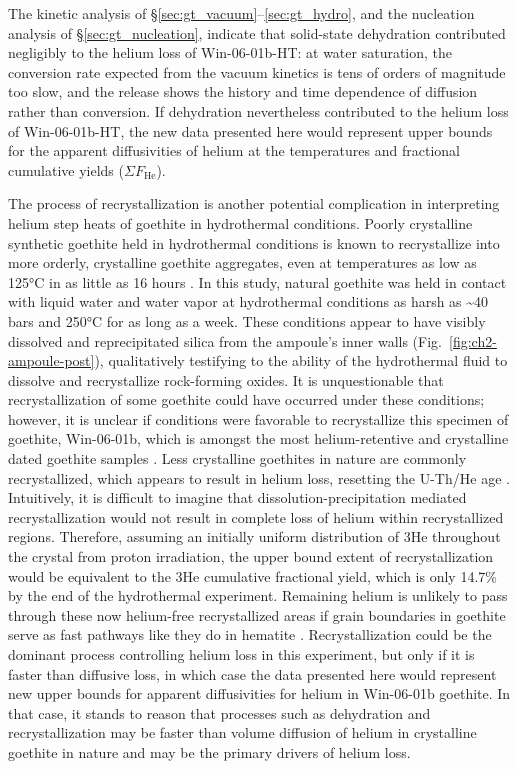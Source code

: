 The kinetic analysis of \S\ref{sec:gt_vacuum}--\ref{sec:gt_hydro}, and the nucleation analysis of
\S\ref{sec:gt_nucleation}, indicate that solid-state dehydration contributed negligibly to the helium loss of Win-06-01b-HT: at water
saturation, the conversion rate expected from the vacuum kinetics is tens of orders of magnitude
too slow, and the release shows the history and time dependence of diffusion rather than
conversion. If dehydration nevertheless contributed to the helium loss of Win-06-01b-HT, the new
data presented here would represent upper
bounds for the apparent diffusivities of helium at the temperatures and
fractional cumulative yields ($\Sigma F_{\mathrm{He}}$).

The process of recrystallization is another potential complication in
interpreting helium step heats of goethite in hydrothermal conditions.
Poorly crystalline synthetic goethite held in hydrothermal conditions is
known to recrystallize into more orderly, crystalline goethite
aggregates, even at temperatures as low as 125°C in as little as 16
hours \citep{schwertmann1985}. In this study, natural goethite was
held in contact with liquid water and water vapor at hydrothermal
conditions as harsh as \textasciitilde40 bars and 250°C for as long as a
week. These conditions appear to have visibly dissolved and
reprecipitated silica from the ampoule's inner walls (Fig.~\ref{fig:ch2-ampoule-post}),
qualitatively testifying to the ability of the hydrothermal fluid to
dissolve and recrystallize rock-forming oxides. It is unquestionable
that recrystallization of some goethite could have occurred under these
conditions; however, it is unclear if conditions were favorable to
recrystallize this specimen of goethite, Win-06-01b, which is amongst
the most helium-retentive and crystalline dated goethite samples
\citep{waltenberg2012,farley2024}. Less crystalline goethites in
nature are commonly recrystallized, which appears to result in helium
loss, resetting the U-Th/He age \citep{monteiro2018,monteiro2014,heim2006}. Intuitively, it is difficult to imagine that
dissolution-precipitation mediated recrystallization would not result in
complete loss of helium within recrystallized regions. Therefore,
assuming an initially uniform distribution of 3He throughout the crystal
from proton irradiation, the upper bound extent of recrystallization
would be equivalent to the 3He cumulative fractional yield, which is
only 14.7\% by the end of the hydrothermal experiment. Remaining helium is
unlikely to pass through these now helium-free recrystallized areas if
grain boundaries in goethite serve as fast pathways like they do in
hematite \citep{farley2018}. Recrystallization could be the dominant process
controlling helium loss in this experiment, but only if it is faster
than diffusive loss, in which case the data presented here would
represent new upper bounds for apparent diffusivities for helium in
Win-06-01b goethite. In that case, it stands to reason that processes
such as dehydration and recrystallization may be faster than volume
diffusion of helium in crystalline goethite in nature and may be the
primary drivers of helium loss.


